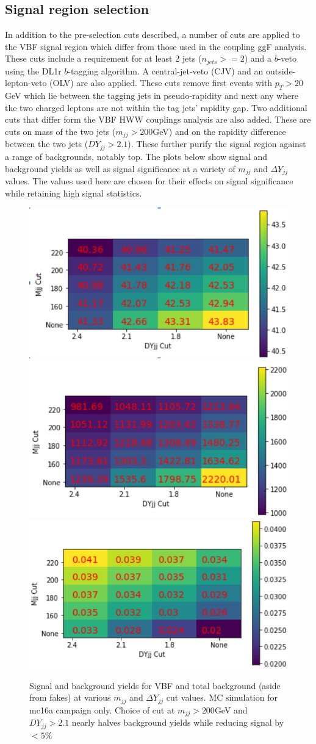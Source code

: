 \subsection{Signal region selection}
In addition to the pre-selection cuts described, a number of cuts are applied to the VBF signal region which differ from those used in the coupling ggF analysis. These cuts include a requirement for at least 2 jets ($n_{jets}>=2$) and a $b$-veto using the DL1r $b$-tagging algorithm. A central-jet-veto (CJV) and an outside-lepton-veto (OLV) are also applied. These cuts remove first events with $p_T >20$GeV which lie between the tagging jets in pseudo-rapidity and next any where the two charged leptons are not within the tag jets' rapidity gap. Two additional cuts that differ form the VBF HWW couplings analysis are also added. These are cuts on mass of the two jets ($m_{jj}>200$GeV) and on the rapidity difference between the two jets ($DY_{jj}>2.1$). These further purify the signal region against a range of backgrounds, notably top. The plots below show signal and background yields as well as signal significance at a variety of $m_{jj}$ and $\Delta Y_{jj}$ values. The values used here are chosen for their effects on signal significance while retaining high signal statistics. 

\begin{figure}[!htbp]
\centering
\includegraphics[width=.3\linewidth]{Pictures/MjjDYjjVBF.png}
\includegraphics[width=.3\linewidth]{Pictures/MjjDYjjBackground.png}
\includegraphics[width=.3\linewidth]{Pictures/MjjDYjjSig.png}
\caption{Signal and background yields for VBF and total background (aside from fakes) at various $m_{jj}$ and $\Delta Y_{jj}$ cut values. MC simulation for mc16a campaign only. Choice of cut at $m_{jj}>200$GeV and $DY_{jj}>2.1$ nearly halves background yields while reducing signal by $<5\%$}
\label{fig:MjjDYjjSig}
\end{figure}

